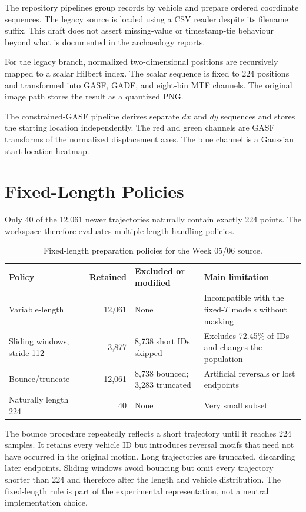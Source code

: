 \documentclass[12pt,a4paper,oneside]{report}
\begin{document}
The repository pipelines group records by vehicle and prepare ordered coordinate sequences. The legacy source is loaded using a CSV reader despite its filename suffix. This draft does not assert missing-value or timestamp-tie behaviour beyond what is documented in the archaeology reports.

For the legacy branch, normalized two-dimensional positions are recursively mapped to a scalar Hilbert index. The scalar sequence is fixed to 224 positions and transformed into GASF, GADF, and eight-bin MTF channels. The original image path stores the result as a quantized PNG.

The constrained-GASF pipeline derives separate $dx$ and $dy$ sequences and stores the starting location independently. The red and green channels are GASF transforms of the normalized displacement axes. The blue channel is a Gaussian start-location heatmap.

\section{Fixed-Length Policies}

Only 40 of the 12,061 newer trajectories naturally contain exactly 224 points. The workspace therefore evaluates multiple length-handling policies.

\begin{table}[htbp]
\centering
\caption{Fixed-length preparation policies for the Week 05/06 source.}
\label{tab:length-policies}
\small
\begin{tabular}{L{0.24\textwidth}rL{0.28\textwidth}L{0.28\textwidth}}
\toprule
Policy & Retained & Excluded or modified & Main limitation \\
\midrule
Variable-length & 12,061 & None & Incompatible with the fixed-$T$ models without masking \\
Sliding windows, stride 112 & 3,877 & 8,738 short IDs skipped & Excludes 72.45\% of IDs and changes the population \\
Bounce/truncate & 12,061 & 8,738 bounced; 3,283 truncated & Artificial reversals or lost endpoints \\
Naturally length 224 & 40 & None & Very small subset \\
\bottomrule
\end{tabular}
\end{table}

The bounce procedure repeatedly reflects a short trajectory until it reaches 224 samples. It retains every vehicle ID but introduces reversal motifs that need not have occurred in the original motion. Long trajectories are truncated, discarding later endpoints. Sliding windows avoid bouncing but omit every trajectory shorter than 224 and therefore alter the length and vehicle distribution. The fixed-length rule is part of the experimental representation, not a neutral implementation choice.
\end{document}
